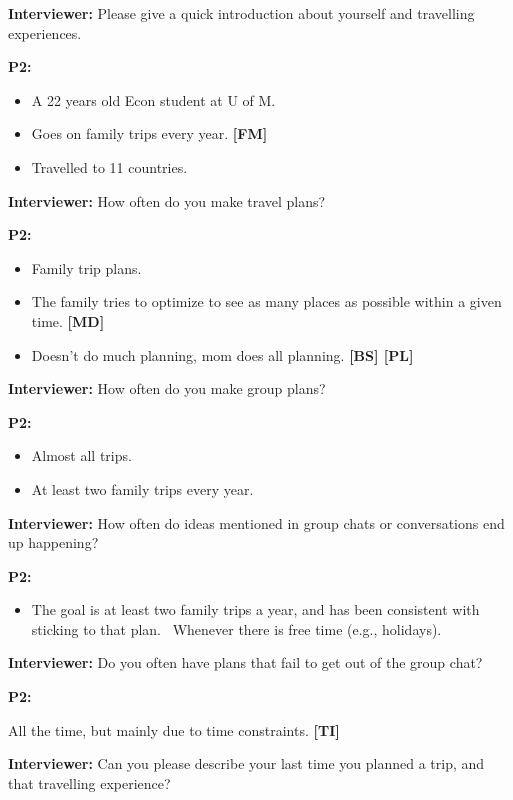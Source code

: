 \documentclass[12pt,a4paper]{article}
\begin{document}
\textbf{Interviewer: }Please give a quick introduction about yourself and travelling experiences.

\textbf{P2: }

\begin{itemize}
    \item A 22 years old Econ student at U of M. 
    \item Goes on family trips every year. \textbf{[FM]}
    \item Travelled to 11 countries.
\end{itemize}

\textbf{Interviewer: }How often do you make travel plans? 

\textbf{P2: }

\begin{itemize}
    \item Family trip plans.
    \item The family tries to optimize to see as many places as possible within a given time. \textbf{[MD]}
    \item Doesn’t do much planning, mom does all planning. \textbf{[BS] [PL]}
\end{itemize}

\textbf{Interviewer: }How often do you make group plans? 

\textbf{P2: }

\begin{itemize}
    \item Almost all trips.
    \item At least two family trips every year. 
\end{itemize}

\textbf{Interviewer: }How often do ideas mentioned in group chats or conversations end up happening? 

\textbf{P2:}

\begin{itemize}
    \item The goal is at least two family trips a year, and has been consistent with sticking to that plan. 
Whenever there is free time (e.g., holidays). 

\end{itemize}

\textbf{Interviewer: }Do you often have plans that fail to get out of the group chat? 

\textbf{P2: }

All the time, but mainly due to time constraints. \textbf{[TI]}

\textbf{Interviewer: }Can you please describe your last time you planned a trip, and that travelling experience? 
\end{document}
